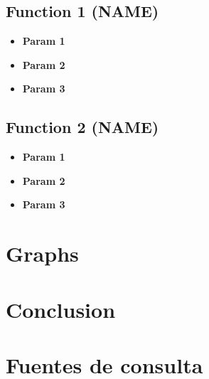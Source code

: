 \documentclass[12pt]{article}
\begin{document}
        \subsection{Function 1 (NAME)}

            \begin{itemize}
                \item \checkmark\textbf{Param 1}
                \item \checkmark\textbf{Param 2}
                \item \checkmark\textbf{Param 3}
            \end{itemize}

        \subsection{Function 2 (NAME)}

            \begin{itemize}
                \item \checkmark\textbf{Param 1}
                \item \checkmark\textbf{Param 2}
                \item \checkmark\textbf{Param 3}
            \end{itemize}

    \section{Graphs}


    \section{Conclusion}


    \section{Fuentes de consulta}
            
\end{document}
